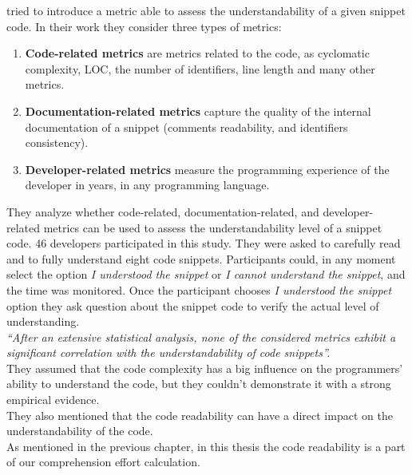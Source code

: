 \documentclass[12pt,mscthesis]{usiinfthesis}
\begin{document}
	\newpage
	\citet{Scalabrino}tried to introduce a metric able to assess the understandability of a given snippet code. In their work they consider three types of metrics:
	\begin{enumerate}
		\item \textbf{Code-related metrics} are metrics related to the code, as cyclomatic complexity, LOC, the number of identifiers, line length and many other metrics.
		\item \textbf{Documentation-related metrics} capture the quality of the internal documentation of a snippet (comments readability, and identifiers consistency). 
		\item \textbf{Developer-related metrics} measure the programming experience of the developer in years, in any programming language.
	\end{enumerate}
	They analyze whether code-related, documentation-related, and developer- related metrics can be used to assess the understandability level of a snippet  code.
	46 developers participated in this study. They were asked to carefully read and to fully understand eight code snippets. Participants could, in any moment select the option \textit{I understood the snippet} or \textit{I cannot understand the snippet}, and the time was monitored.
	Once the participant chooses \textit{I understood the snippet} option they ask question about the snippet code to verify the actual level of understanding.\\ 
	\textit{``After an extensive statistical analysis, none of the considered metrics exhibit a significant correlation with the understandability of code snippets''.}\\
	They assumed that the code complexity has a big influence on the programmers' ability to understand the code, but they couldn't demonstrate it with a strong empirical evidence.\\
	They also mentioned that the code readability can have a direct impact on the understandability of the code.\\ As mentioned in the previous chapter, in this thesis the code readability is a part of our comprehension effort calculation.\\
\end{document}
